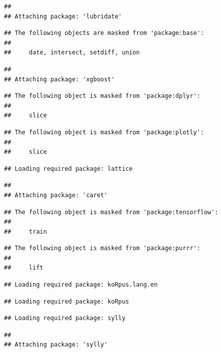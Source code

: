\documentclass[
]{article}
\begin{document}
\begin{verbatim}
## 
## Attaching package: 'lubridate'
\end{verbatim}

\begin{verbatim}
## The following objects are masked from 'package:base':
## 
##     date, intersect, setdiff, union
\end{verbatim}

\begin{verbatim}
## 
## Attaching package: 'xgboost'
\end{verbatim}

\begin{verbatim}
## The following object is masked from 'package:dplyr':
## 
##     slice
\end{verbatim}

\begin{verbatim}
## The following object is masked from 'package:plotly':
## 
##     slice
\end{verbatim}

\begin{verbatim}
## Loading required package: lattice
\end{verbatim}

\begin{verbatim}
## 
## Attaching package: 'caret'
\end{verbatim}

\begin{verbatim}
## The following object is masked from 'package:tensorflow':
## 
##     train
\end{verbatim}

\begin{verbatim}
## The following object is masked from 'package:purrr':
## 
##     lift
\end{verbatim}

\begin{verbatim}
## Loading required package: koRpus.lang.en
\end{verbatim}

\begin{verbatim}
## Loading required package: koRpus
\end{verbatim}

\begin{verbatim}
## Loading required package: sylly
\end{verbatim}

\begin{verbatim}
## 
## Attaching package: 'sylly'
\end{verbatim}
\end{document}
